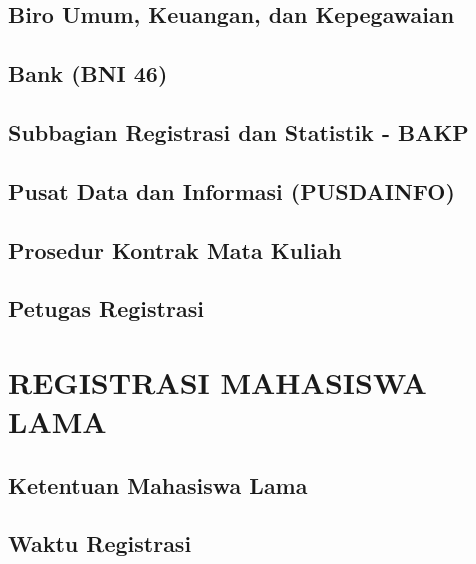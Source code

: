 \documentclass[
]{book}
\begin{document}
\hypertarget{biro-umum-keuangan-dan-kepegawaian}{%
\section{Biro Umum, Keuangan, dan Kepegawaian}\label{biro-umum-keuangan-dan-kepegawaian}}

\hypertarget{bank-bni-46}{%
\section{Bank (BNI 46)}\label{bank-bni-46}}

\hypertarget{subbagian-registrasi-dan-statistik---bakp}{%
\section{Subbagian Registrasi dan Statistik - BAKP}\label{subbagian-registrasi-dan-statistik---bakp}}

\hypertarget{pusat-data-dan-informasi-pusdainfo}{%
\section{Pusat Data dan Informasi (PUSDAINFO)}\label{pusat-data-dan-informasi-pusdainfo}}

\hypertarget{prosedur-kontrak-mata-kuliah}{%
\section{Prosedur Kontrak Mata Kuliah}\label{prosedur-kontrak-mata-kuliah}}

\hypertarget{petugas-registrasi}{%
\section{Petugas Registrasi}\label{petugas-registrasi}}

\hypertarget{registrasi-mahasiswa-lama}{%
\chapter{REGISTRASI MAHASISWA LAMA}\label{registrasi-mahasiswa-lama}}

\hypertarget{ketentuan-mahasiswa-lama}{%
\section{Ketentuan Mahasiswa Lama}\label{ketentuan-mahasiswa-lama}}

\hypertarget{waktu-registrasi-1}{%
\section{Waktu Registrasi}\label{waktu-registrasi-1}}
\end{document}
